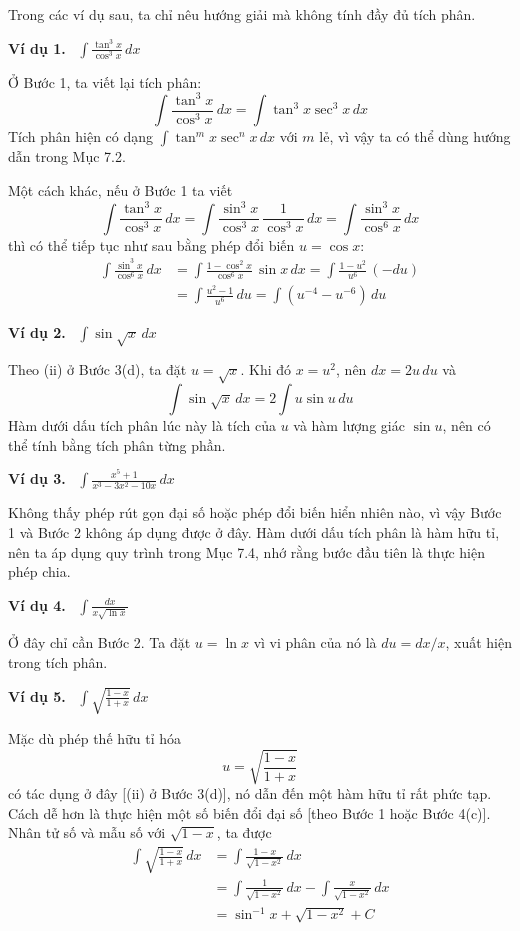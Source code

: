 \documentclass[12pt,a4paper]{article}
\newcommand{\ex}[1]{\par\medskip\noindent\textbf{Ví dụ #1.}\ }
\begin{document}
Trong các ví dụ sau, ta chỉ nêu hướng giải mà không tính đầy đủ tích phân.

\ex{1} $\displaystyle\int\frac{\tan^3x}{\cos^3x}\,dx$

Ở Bước 1, ta viết lại tích phân:
\[\int\frac{\tan^3x}{\cos^3x}\,dx=\int\tan^3x\sec^3x\,dx\]
Tích phân hiện có dạng $\int\tan^mx\sec^nx\,dx$ với $m$ lẻ, vì vậy ta có thể dùng hướng dẫn trong Mục 7.2.

Một cách khác, nếu ở Bước 1 ta viết
\[\int\frac{\tan^3x}{\cos^3x}\,dx
=\int\frac{\sin^3x}{\cos^3x}\,\frac1{\cos^3x}\,dx
=\int\frac{\sin^3x}{\cos^6x}\,dx\]
thì có thể tiếp tục như sau bằng phép đổi biến $u=\cos x$:
\begin{align*}
\int\frac{\sin^3x}{\cos^6x}\,dx
&=\int\frac{1-\cos^2x}{\cos^6x}\,\sin x\,dx
=\int\frac{1-u^2}{u^6}\,(-du)\\
&=\int\frac{u^2-1}{u^6}\,du
=\int(u^{-4}-u^{-6})\,du
\end{align*}

\ex{2} $\displaystyle\int\sin\sqrt{x}\,dx$

Theo (ii) ở Bước 3(d), ta đặt $u=\sqrt{x}$. Khi đó $x=u^2$, nên $dx=2u\,du$ và
\[\int\sin\sqrt{x}\,dx=2\int u\sin u\,du\]
Hàm dưới dấu tích phân lúc này là tích của $u$ và hàm lượng giác $\sin u$, nên có thể tính bằng tích phân từng phần.

\ex{3} $\displaystyle\int\frac{x^5+1}{x^3-3x^2-10x}\,dx$

Không thấy phép rút gọn đại số hoặc phép đổi biến hiển nhiên nào, vì vậy Bước 1 và Bước 2 không áp dụng được ở đây. Hàm dưới dấu tích phân là hàm hữu tỉ, nên ta áp dụng quy trình trong Mục 7.4, nhớ rằng bước đầu tiên là thực hiện phép chia.

\ex{4} $\displaystyle\int\frac{dx}{x\sqrt{\ln x}}$

Ở đây chỉ cần Bước 2. Ta đặt $u=\ln x$ vì vi phân của nó là $du=dx/x$, xuất hiện trong tích phân.

\ex{5} $\displaystyle\int\sqrt{\frac{1-x}{1+x}}\,dx$

Mặc dù phép thế hữu tỉ hóa
\[u=\sqrt{\frac{1-x}{1+x}}\]
có tác dụng ở đây [(ii) ở Bước 3(d)], nó dẫn đến một hàm hữu tỉ rất phức tạp. Cách dễ hơn là thực hiện một số biến đổi đại số [theo Bước 1 hoặc Bước 4(c)]. Nhân tử số và mẫu số với $\sqrt{1-x}$, ta được
\begin{align*}
\int\sqrt{\frac{1-x}{1+x}}\,dx
&=\int\frac{1-x}{\sqrt{1-x^2}}\,dx\\
&=\int\frac1{\sqrt{1-x^2}}\,dx-\int\frac{x}{\sqrt{1-x^2}}\,dx\\
&=\sin^{-1}x+\sqrt{1-x^2}+C
\end{align*}
\end{document}
